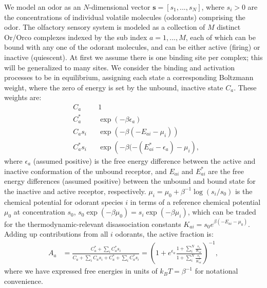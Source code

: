 \documentclass[9pt,twoside,lineno]{pnas-new}
\begin{document}
We model an odor as an $N$-dimensional vector ${\mathbf s=[ s_1,...,s_N]}$, where $s_i > 0$ are the concentrations of individual volatile molecules (odorants) comprising the odor. 
The olfactory sensory system is modeled as a collection of $M$ distinct Or/Orco complexes indexed by the sub index $a=1,...,M$, each of which can be bound with any one of the odorant molecules, and can be either active (firing) or inactive (quiescent). At first we assume there is one binding site per complex; this will be generalized to many sites. We consider the binding and activation processes to be in equilibrium, assigning each state a corresponding Boltzmann weight, where the zero of energy is set by the unbound, inactive state $C_a$. These weights are:
\begin{align}
    &C_a        &&      1 \nonumber \\
    &C^*_a      &&      \exp({-\beta \epsilon_a}) \nonumber \\
    &C_as_i     &&      \exp({-\beta(-E_{ai}  - \mu_{i})}) \nonumber \\
    &C^*_as_i   &&      \exp({-\beta(-(E_{ai}^* - \epsilon_a) - \mu_{i}}),
\end{align}
where $\epsilon_a$ (assumed positive) is the free energy difference between the active and inactive conformation of the unbound receptor, and $E_{ai}$ and $E_{ai}^*$ are the free energy differences (assumed positive) between the unbound and bound state for the inactive and active receptor, respectively. $\mu_{i}=\mu_0+\beta^{-1}\log(s_i/s_0)$ is the chemical potential for odorant species $i$ in terms of a reference chemical potential $\mu_0$ at concentration $s_0$, $s_0\exp(-\beta \mu_0) = s_i\exp(-\beta \mu_{i})$, which can be traded for the thermodynamic-relevant disassociation constants $K_{ai} = s_0 e^{\beta (-E_{ai} - \mu_0)}$. %
Adding up contributions from all $i$ odorants, the active fraction is:
\begin{align}
A_a &= \frac{
    C^*_a + \sum_i C^*_as_i}{C_a + \sum_i C_as_i + C^*_a + \sum_i C^*_as_i} %
    = 
    \left(1 + e^{\epsilon_a}\frac{1 + \sum_i^N \frac{s_i}{K_{ai}}}{1 + \sum_i^N \frac{s_i}{K^*_{ai}}}
    \right)^{-1}, 
    \label{eq:steady_state_act}
\end{align} 
where we have expressed free energies in units of $k_B T=\beta^{-1}$ for notational convenience.
\end{document}
